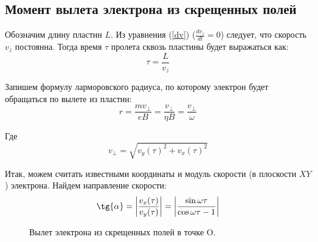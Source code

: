 \subsection{Момент вылета электрона из скрещенных полей}

Обозначим длину пластин $L$. Из уравнения (\ref{dv}) ($\frac{dv_z}{dt}=0$) следует, что скорость $v_z$ постоянна. Тогда время $\tau$ пролета сквозь пластины будет выражаться как:
\begin{equation}
	\tau=\frac{L}{v_z}
\end{equation}

Запишем формулу ларморовского радиуса, по которому электрон будет обращаться по вылете из пластин:
\begin{equation}
	r=\frac{mv_\perp}{eB}=\frac{v_\perp}{\eta{B}}=\frac{v_\perp}{\omega}
\end{equation}

Где 
\begin{equation}
	v_\perp=\sqrt{v_y(\tau)^2+v_x(\tau)^2}
\end{equation}

Итак, можем считать известными координаты и модуль скорости (в плоскости $XY$) электрона. 
Найдем направление скорости:
\begin{equation}
	\label{eq:tg_a}
	\tg{\alpha}=\left|\frac{v_x(\tau)}{v_y(\tau)}\right|=\left|\frac{\sin{\omega{\tau}}}{\cos\omega{\tau}-1}\right|
\end{equation}



\begin{figure}[ht!]
\vspace{1cm}
\centering
\begin{minipage}[ht!]{0.49\linewidth}
\end{minipage}
\hfill
\begin{minipage}[ht!]{0.49\linewidth}
\end{minipage}
\vspace{0.5cm}
\caption{Вылет электрона из скрещенных полей в точке O.}
\vspace{1cm}
\label{ris:vert_hor}
\end{figure}


